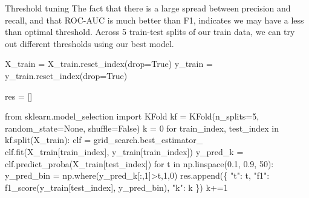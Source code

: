 \documentclass[
  10pt,
  ignorenonframetext,
  aspectratio=169]{beamer}
\newenvironment{Shaded}{\begin{snugshade}}{\end{snugshade}}
\newcommand{\ControlFlowTok}[1]{\textcolor[rgb]{0.94,0.87,0.69}{#1}}
\newcommand{\DecValTok}[1]{\textcolor[rgb]{0.86,0.86,0.80}{#1}}
\newcommand{\FloatTok}[1]{\textcolor[rgb]{0.75,0.75,0.82}{#1}}
\newcommand{\ImportTok}[1]{\textcolor[rgb]{0.80,0.80,0.80}{#1}}
\newcommand{\KeywordTok}[1]{\textcolor[rgb]{0.94,0.87,0.69}{#1}}
\newcommand{\NormalTok}[1]{\textcolor[rgb]{0.80,0.80,0.80}{#1}}
\newcommand{\OperatorTok}[1]{\textcolor[rgb]{0.94,0.94,0.82}{#1}}
\newcommand{\StringTok}[1]{\textcolor[rgb]{0.80,0.58,0.58}{#1}}
\newcommand{\VariableTok}[1]{\textcolor[rgb]{0.80,0.80,0.80}{#1}}
\begin{document}
\begin{frame}[fragile]{Threshold tuning}
\protect\hypertarget{threshold-tuning}{}
The fact that there is a large spread between precision and recall, and
that ROC-AUC is much better than F1, indicates we may have a less than
optimal threshold. Across 5 train-test splits of our train data, we can
try out different thresholds using our best model.

\medskip
\scriptsize

\begin{Shaded}
\begin{Highlighting}[]
\NormalTok{X\_train }\OperatorTok{=}\NormalTok{ X\_train.reset\_index(drop}\OperatorTok{=}\VariableTok{True}\NormalTok{)}
\NormalTok{y\_train }\OperatorTok{=}\NormalTok{ y\_train.reset\_index(drop}\OperatorTok{=}\VariableTok{True}\NormalTok{)}

\NormalTok{res }\OperatorTok{=}\NormalTok{ []}

\ImportTok{from}\NormalTok{ sklearn.model\_selection }\ImportTok{import}\NormalTok{ KFold}
\NormalTok{kf }\OperatorTok{=}\NormalTok{ KFold(n\_splits}\OperatorTok{=}\DecValTok{5}\NormalTok{, random\_state}\OperatorTok{=}\VariableTok{None}\NormalTok{, shuffle}\OperatorTok{=}\VariableTok{False}\NormalTok{)}
\NormalTok{k }\OperatorTok{=} \DecValTok{0}
\ControlFlowTok{for}\NormalTok{ train\_index, test\_index }\KeywordTok{in}\NormalTok{ kf.split(X\_train):}
\NormalTok{    clf }\OperatorTok{=}\NormalTok{ grid\_search.best\_estimator\_}
\NormalTok{    clf.fit(X\_train[train\_index], y\_train[train\_index])}
\NormalTok{    y\_pred\_k }\OperatorTok{=}\NormalTok{ clf.predict\_proba(X\_train[test\_index])}
    \ControlFlowTok{for}\NormalTok{ t }\KeywordTok{in}\NormalTok{ np.linspace(}\FloatTok{0.1}\NormalTok{, }\FloatTok{0.9}\NormalTok{, }\DecValTok{50}\NormalTok{):}
\NormalTok{        y\_pred\_bin }\OperatorTok{=}\NormalTok{ np.where(y\_pred\_k[:,}\DecValTok{1}\NormalTok{]}\OperatorTok{\textgreater{}}\NormalTok{t,}\DecValTok{1}\NormalTok{,}\DecValTok{0}\NormalTok{)}
\NormalTok{        res.append(\{}
            \StringTok{"t"}\NormalTok{: t, }
            \StringTok{"f1"}\NormalTok{: f1\_score(y\_train[test\_index], y\_pred\_bin),}
            \StringTok{"k"}\NormalTok{: k}
\NormalTok{        \})}
\NormalTok{    k}\OperatorTok{+=}\DecValTok{1}
    
\end{Highlighting}
\end{Shaded}


\end{frame}
\end{document}
